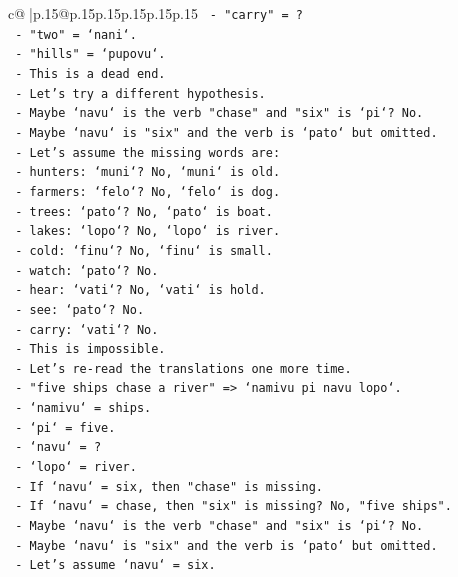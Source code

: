 \documentclass{article}
\begin{document}
{\begin{supertabular}{c@{$\;$}|p{.15\linewidth}@{}p{.15\linewidth}p{.15\linewidth}p{.15\linewidth}p{.15\linewidth}p{.15\linewidth}}
{{{\texttt{    {-} "carry" = ?} \\
\texttt{    {-} "two" = `nani`.} \\
\texttt{    {-} "hills" = `pupovu`.} \\
\texttt{  {-} This is a dead end.} \\
\texttt{  {-} Let's try a different hypothesis.} \\
\texttt{  {-} Maybe `navu` is the verb "chase" and "six" is `pi`? No.} \\
\texttt{  {-} Maybe `navu` is "six" and the verb is `pato` but omitted.} \\
\texttt{  {-} Let's assume the missing words are:} \\
\texttt{    {-} hunters: `muni`? No, `muni` is old.} \\
\texttt{    {-} farmers: `felo`? No, `felo` is dog.} \\
\texttt{    {-} trees: `pato`? No, `pato` is boat.} \\
\texttt{    {-} lakes: `lopo`? No, `lopo` is river.} \\
\texttt{    {-} cold: `finu`? No, `finu` is small.} \\
\texttt{    {-} watch: `pato`? No.} \\
\texttt{    {-} hear: `vati`? No, `vati` is hold.} \\
\texttt{    {-} see: `pato`? No.} \\
\texttt{    {-} carry: `vati`? No.} \\
\texttt{  {-} This is impossible.} \\
\texttt{  {-} Let's re{-}read the translations one more time.} \\
\texttt{  {-} "five ships chase a river" => `namivu pi navu lopo`.} \\
\texttt{    {-} `namivu` = ships.} \\
\texttt{    {-} `pi` = five.} \\
\texttt{    {-} `navu` = ?} \\
\texttt{    {-} `lopo` = river.} \\
\texttt{    {-} If `navu` = six, then "chase" is missing.} \\
\texttt{    {-} If `navu` = chase, then "six" is missing? No, "five ships".} \\
\texttt{    {-} Maybe `navu` is the verb "chase" and "six" is `pi`? No.} \\
\texttt{    {-} Maybe `navu` is "six" and the verb is `pato` but omitted.} \\
\texttt{    {-} Let's assume `navu` = six.} \\
}}}
\end{supertabular}}
\end{document}
